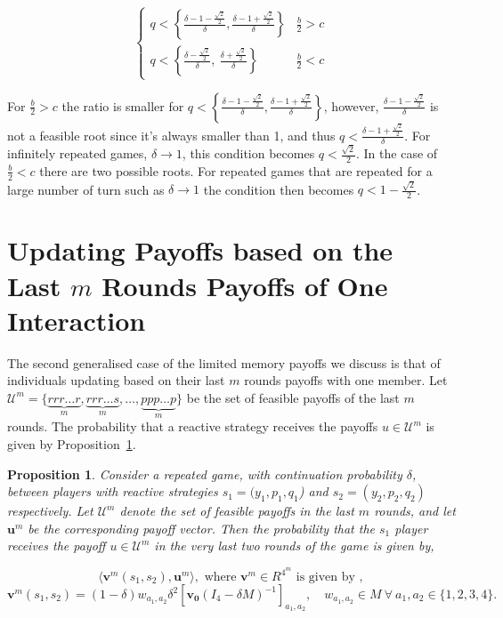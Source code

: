 \documentclass[11pt]{article}
\theoremstyle{plainCl1}
\newtheorem{Prop}{Proposition}
\theoremstyle{plainCl2}
\begin{document}
\begin{equation}
\begin{cases}
  q < \left\{\frac{\delta - 1 - \frac{\sqrt{2}}{2}}{\delta}, \frac{\delta - 1 + \frac{\sqrt{2}}{2}}{\delta}\right\}  & \frac{b}{2} > c \\[0.5cm]
  q < \left\{\frac{\delta - \frac{\sqrt{2}}{2}}{\delta}, \  \frac{\delta + \frac{\sqrt{2}}{2}}{\delta}\right\} & \frac{b}{2} < c
\end{cases}
\end{equation}

For \(\frac{b}{2}>c\) the ratio is smaller for \(q < \left\{\frac{\delta - 1 -
\frac{\sqrt{2}}{2}}{\delta}, \frac{\delta - 1 +
\frac{\sqrt{2}}{2}}{\delta}\right\}\), however, \(\frac{\delta - 1 -
\frac{\sqrt{2}}{2}}{\delta}\) is not a feasible root since it's always smaller
than 1, and thus \(q < \frac{\delta - 1 + \frac{\sqrt{2}}{2}}{\delta}\). For
infinitely repeated games, \(\delta \rightarrow 1\), this condition becomes \(q
< \frac{\sqrt{2}}{2}\). In the case of \(\frac{b}{2}<c\) there are two possible
roots. For repeated games that are repeated for a large number of turn such as
\(\delta \rightarrow 1\) the condition then becomes \(q < 1 -
\frac{\sqrt{2}}{2}\).

\section{Updating Payoffs based on the Last $m$ Rounds Payoffs of One Interaction}\label{section:m_two_n_one}

The second generalised case of the limited memory payoffs we discuss is that of
individuals updating based on their last $m$ rounds payoffs with one member. Let
\(\mathcal{U}^{m}= \{\underbrace{rrr\dots r}_{m}, \underbrace{rrr\dots s}_{m},
\dots, \underbrace{ppp\dots p}_{m}\}\) be the set of feasible payoffs of the
last $m$ rounds. The probability that a reactive strategy receives the payoffs
$u\!\in\! \mathcal{U}^{m}$ is given by
Proposition~\ref{proposition:last_m_rounds}.

\begin{Prop}\label{proposition:last_m_rounds} Consider a repeated game, with
  continuation probability $\delta$, between players with reactive strategies
  $s_1\!=\!(y_1, p_1, q_1$) and $s_2\!=\!(y_2,p_2,q_2)$ respectively. Let
  $\mathcal{U}^{m}$ denote the set of feasible payoffs in the last
  \(m\) rounds, and let \(\mathbf{u}^{m}\) be the corresponding payoff vector.
  Then the probability that the $s_1$ player receives the payoff $u\!\in\!
  \mathcal{U}^{m}$ in the very last two rounds of the game is given by,

  \begin{equation}
  \langle\mathbf{v}^{m}(s_1,s_2),\mathbf{u}^{m}\rangle, \text{ where } \mathbf{v}^{m} \in R^{4^{m}} \text{ is given by },
  \end{equation}
  \begin{equation}
    \mathbf{v}^{m}(s_1,s_2) = (1 - \delta) w_{a_1, a_2} \delta^2 \left[\mathbf{v_0}(I_4 - \delta M)^{-1}\right]_{a_1, a_2}, \quad  w_{a_1, a_2} \in M \ \forall \ a_1, a_2 \in \{1, 2, 3, 4\}.
  \end{equation}
\end{Prop}
\end{document}
